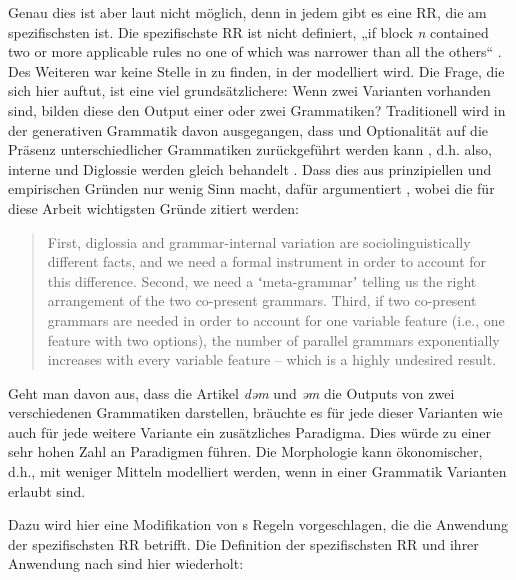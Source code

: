 Genau dies ist aber laut \citet{Stump2001} nicht möglich, denn in jedem  gibt es eine RR, die am spezifischsten ist. Die spezifischste RR ist nicht definiert, „if block \textit{n} contained two or more applicable rules no one of which was narrower than all the others“ \citep[53]{Stump2001}. Des Weiteren war keine Stelle in \citet{Stump2001} zu finden, in der  modelliert wird. Die Frage, die sich hier auftut, ist eine viel grundsätzlichere: Wenn zwei Varianten vorhanden sind, bilden diese den Output einer oder zwei Grammatiken? Traditionell wird in der generativen Grammatik davon ausgegangen, dass  und Optionalität auf die Präsenz unterschiedlicher Grammatiken zurückgeführt werden kann \citep[385]{Seiler2004}, d.h. also, interne  und Diglossie werden gleich behandelt \citep[384]{Seiler2004}. Dass dies aus prinzipiellen und empirischen Gründen nur wenig Sinn macht, dafür argumentiert \citet{Seiler2004}, wobei die für diese Arbeit wichtigsten Gründe zitiert werden:

\begin{quote}
First, diglossia and grammar-internal variation are sociolinguistically different facts, and we need a formal instrument in order to account for this difference. Second, we need a ʻmeta-grammarʼ telling us the right arrangement of the two co-present grammars. Third, if two co-present grammars are needed in order to account for one variable feature (i.e., one feature with two options), the number of parallel grammars exponentially increases with every variable feature – which is a highly undesired result. \citep[384]{Seiler2004}
\end{quote}


Geht man davon aus, dass die Artikel \textit{dəm} und \textit{əm} die Outputs von zwei verschiedenen Grammatiken darstellen, bräuchte es für jede dieser Varianten wie auch für jede weitere Variante ein zusätzliches Paradigma. Dies würde zu einer sehr hohen Zahl an Paradigmen führen. Die Morphologie kann ökonomischer, d.h., mit weniger Mitteln modelliert werden, wenn in einer Grammatik Varianten erlaubt sind.

Dazu wird hier eine Modifikation von \citeauthor{Stump2001}s \citeyearpar{Stump2001} Regeln vorgeschlagen, die die Anwendung der spezifischsten RR betrifft. Die Definition der spezifischsten RR  und ihrer Anwendung  nach \citet{Stump2001} sind hier wiederholt:

